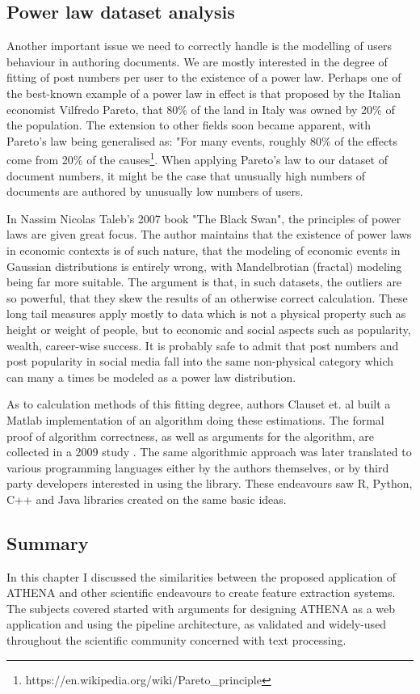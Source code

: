 \subsection{Power law dataset analysis}
Another important issue we need to correctly handle is the modelling of users behaviour in authoring documents. We are mostly interested in the degree of fitting of post numbers per user to the existence of a power law. Perhaps one of the best-known example of a power law in effect is that proposed by the Italian economist Vilfredo Pareto, that 80\% of the land in Italy was owned by 20\% of the population. The extension to other fields soon became apparent, with Pareto's law being generalised as: "For many events, roughly 80\% of the effects come from 20\% of the causes\footnote{https://en.wikipedia.org/wiki/Pareto\_principle}. When applying Pareto's law to our dataset of document numbers, it might be the case that unusually high numbers of documents are authored by unusually low numbers of users.

In Nassim Nicolas Taleb's 2007 book "The Black Swan"\cite{taleb2007black}, the principles of power laws are given great focus. The author maintains that the existence of power laws in economic contexts is of such nature, that the modeling of economic events in Gaussian distributions is entirely wrong, with Mandelbrotian (fractal) modeling being far more suitable. The argument is that, in such datasets, the outliers are so powerful, that they skew the results of an otherwise correct calculation. These long tail measures apply mostly to data which is not a physical property such as height or weight of people, but to economic and social aspects such as popularity, wealth, career-wise success. It is probably safe to admit that post numbers and post popularity in social media fall into the same non-physical category which can many a times be modeled as a power law distribution.

As to calculation methods of this fitting degree, authors Clauset et. al built a Matlab implementation of an algorithm doing these estimations. The formal proof of algorithm correctness, as well as arguments for the algorithm, are collected in a 2009 study \cite{clauset2009power}. The same algorithmic approach was later translated to various programming languages either by the authors themselves, or by third party developers interested in using the library. These endeavours saw R, Python, C++ and Java libraries created on the same basic ideas.

\subsection*{Summary}
In this chapter I discussed the similarities between the proposed application of ATHENA and other scientific endeavours to create feature extraction systems. The subjects covered started with arguments for designing ATHENA as a web application and using the pipeline architecture, as validated and widely-used throughout the scientific community concerned with text processing.

